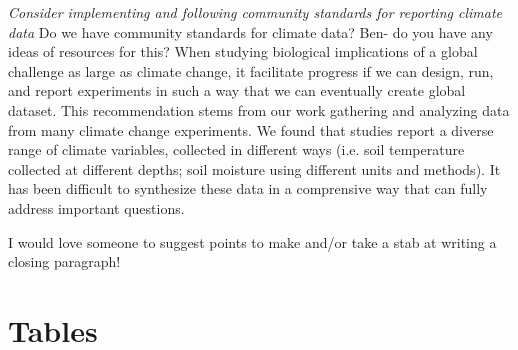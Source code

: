 \documentclass{article}
\begin{document}
\par\textit{Consider implementing and following community standards for reporting climate data} Do we have community standards for climate data? Ben- do you have any ideas of resources for this?
When studying biological implications of a global challenge as large as climate change, it facilitate progress if we can design, run, and report experiments in such a way that we can eventually create global dataset. This recommendation stems from our work gathering and analyzing data from many climate change experiments. We found that studies report a diverse range of climate variables, collected in different ways (i.e. soil temperature collected at different depths; soil moisture using different units and methods). It has been difficult to synthesize these data in a comprensive way that can fully address important questions. 
\par I would love someone to suggest points to make and/or take a stab at writing a closing paragraph!

\section* {Tables}
\end{document}
